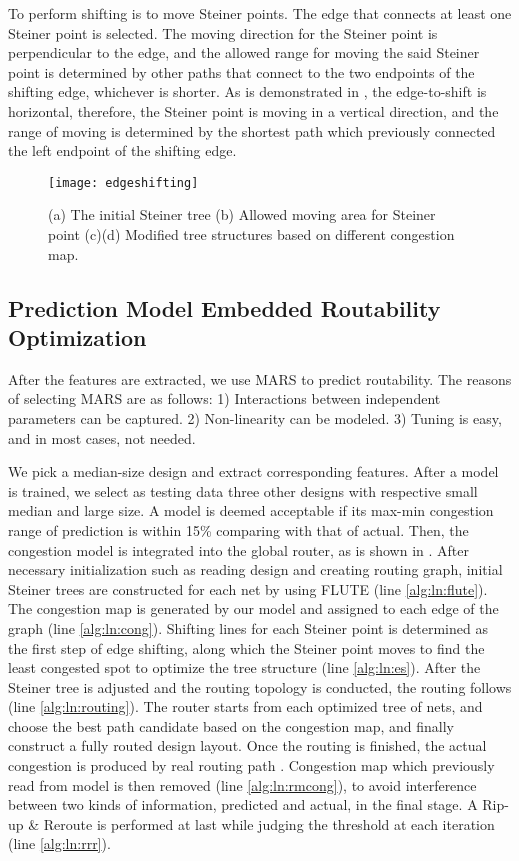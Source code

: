 To perform shifting is to move Steiner points. The edge that connects at least one Steiner point is selected. The moving direction for the Steiner point is perpendicular to the edge, and the allowed range for moving the said Steiner point is determined by other paths that connect to the two endpoints of the shifting edge, whichever is shorter. As is demonstrated in , the edge-to-shift is horizontal, therefore, the Steiner point is moving in a vertical direction, and the range of moving is determined by the shortest path which previously connected the left endpoint of the shifting edge. 
\begin{figure}[htbp]
    \centerline{\texttt{[image: edgeshifting]}}
    \caption{(a) The initial Steiner tree (b) Allowed moving area for Steiner point (c)(d) Modified tree structures based on different congestion map.}
    \label{fig:edgeshifting}
\end{figure}

\subsection{Prediction Model Embedded Routability Optimization}
After the features are extracted, we use MARS \cite{MARS} to predict routability. The reasons of selecting MARS are as follows: 1) Interactions between independent parameters can be captured. 2) Non-linearity can be modeled. 3) Tuning is easy, and in most cases, not needed. 

We pick a median-size design and extract corresponding features.
After a model is trained, we select as testing data three other designs with respective small median and large size.
A model is deemed acceptable if its max-min congestion range of prediction is within 15\% comparing with that of actual.
Then, the congestion model is integrated into the global router, as is shown in .
After necessary initialization such as reading design and creating routing graph, initial Steiner trees are constructed for each net by using FLUTE \cite{FLUTE} (line \ref*{alg:ln:flute}).
The congestion map is generated by our model and assigned to each edge of the graph (line \ref*{alg:ln:cong}).
Shifting lines for each Steiner point is determined as the first step of edge shifting,
along which the Steiner point moves to find the least congested spot to optimize the tree structure (line \ref*{alg:ln:es}).
After the Steiner tree is adjusted and the routing topology is conducted, the routing follows (line \ref*{alg:ln:routing}).
The router starts from each optimized tree of nets, and choose the best path candidate based on the congestion map, and finally construct a fully routed design layout.
Once the routing is finished, the actual congestion is produced by real routing path
. Congestion map which previously read from model is then removed (line \ref*{alg:ln:rmcong}), to avoid interference between two kinds of information, predicted and actual, in the final stage.
A Rip-up \& Reroute is performed at last while judging the threshold at each iteration (line \ref*{alg:ln:rrr}).


